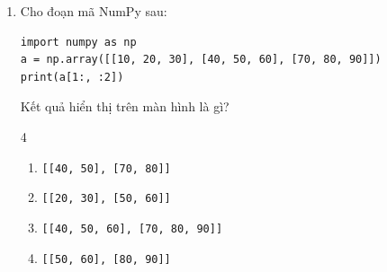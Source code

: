 \documentclass[11pt,a4paper]{article}
\begin{document}
\begin{enumerate}[leftmargin=*,itemsep=2pt]
\item Cho đoạn mã NumPy sau:
\begin{lstlisting}
import numpy as np
a = np.array([[10, 20, 30], [40, 50, 60], [70, 80, 90]])
print(a[1:, :2])
\end{lstlisting}
Kết quả hiển thị trên màn hình là gì?
\begin{multicols}{4}
\begin{enumerate}[label=\Alph*.]
  \item \texttt{[[40, 50], [70, 80]]}
  \item \texttt{[[20, 30], [50, 60]]}
  \item \texttt{[[40, 50, 60], [70, 80, 90]]}
  \item \texttt{[[50, 60], [80, 90]]}
\end{enumerate}
\end{multicols}

\end{enumerate}
\end{document}

